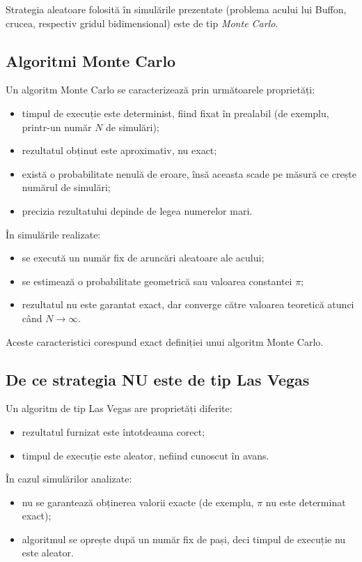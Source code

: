 \documentclass[12pt]{article}
\begin{document}
Strategia aleatoare folosită în simulările prezentate (problema acului lui Buffon, crucea, respectiv gridul bidimensional) este de tip \emph{Monte Carlo}.

\subsection{Algoritmi Monte Carlo}

Un algoritm Monte Carlo se caracterizează prin următoarele proprietăți:
\begin{itemize}
  \item timpul de execuție este determinist, fiind fixat în prealabil (de exemplu, printr-un număr $N$ de simulări);
  \item rezultatul obținut este aproximativ, nu exact;
  \item există o probabilitate nenulă de eroare, însă aceasta scade pe măsură ce crește numărul de simulări;
  \item precizia rezultatului depinde de legea numerelor mari.
\end{itemize}

În simulările realizate:
\begin{itemize}
  \item se execută un număr fix de aruncări aleatoare ale acului;
  \item se estimează o probabilitate geometrică sau valoarea constantei $\pi$;
  \item rezultatul nu este garantat exact, dar converge către valoarea teoretică atunci când $N \to \infty$.
\end{itemize}

Aceste caracteristici corespund exact definiției unui algoritm Monte Carlo.

\subsection{De ce strategia NU este de tip Las Vegas}

Un algoritm de tip Las Vegas are proprietăți diferite:
\begin{itemize}
  \item rezultatul furnizat este întotdeauna corect;
  \item timpul de execuție este aleator, nefiind cunoscut în avans.
\end{itemize}

În cazul simulărilor analizate:
\begin{itemize}
  \item nu se garantează obținerea valorii exacte (de exemplu, $\pi$ nu este determinat exact);
  \item algoritmul se oprește după un număr fix de pași, deci timpul de execuție nu este aleator.
\end{itemize}
\end{document}
